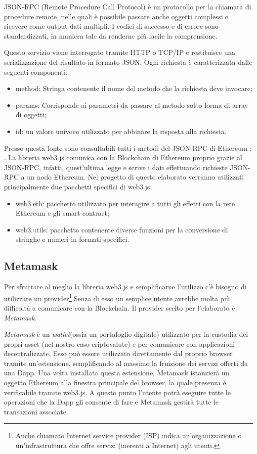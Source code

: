JSON-RPC (Remote Procedure Call Protocol) è un protocollo per la chiamata di procedure remote,  nelle quali è possibile passare anche oggetti complessi e ricevere come output dati multipli. I codici di successo e di errore sono standardizzati, in maniera tale da renderne più facile la comprensione.

Questo servizio viene interrogato tramite HTTP o TCP/IP e restituisce una serializzazione del risultato in formato JSON. Ogni richiesta è caratterizzata dalle seguenti componenti:
\begin{itemize}
\item method: Stringa contenente il nome del metodo che la richiesta deve invocare;
\item params: Corrisponde ai parametri da passare al metodo sotto forma di array di oggetti;
\item id: un valore univoco utilizzato per abbinare la risposta alla richiesta.
\end{itemize}

Presso questa fonte sono consultabili tutti i metodi del JSON-RPC di Ethereum : \cite{eth_rpc}.
La libreria web3.js comunica con la Blockchain di Ethereum proprio grazie al JSON-RPC, infatti, quest'ultima legge e scrive i dati effettuando richieste JSON-RPC a un nodo Ethereum.
Nel progetto di questo elaborato verranno utilizzati principalmente due pacchetti specifici di web3.js:
\begin{itemize}
\item web3.eth: pacchetto utilizzato per interagire a tutti gli effetti con la rete Ethereum e gli smart-contract;
\item web3.utils: pacchetto contenente diverse funzioni per la conversione di stringhe e numeri in formati specifici.
\end{itemize}

\subsection{Metamask}\label{metamask}
Per sfruttare al meglio la libreria web3.js e semplificarne l'utilizzo c'è bisogno di utilizzare un provider\footnote{Anche chiamato Internet service provider (ISP) indica un'organizzazione o un'infrastruttura che offre servizi (inerenti a Internet) agli utenti.}.Senza di esso un semplice utente avrebbe molta più difficoltà a comunicare con la Blockchain.
Il provider scelto per l'elaborato è \textit{Metamask}. 

\textit{Metamask} è un \textit{wallet}(ossia un portafoglio digitale) utilizzato per la custodia dei propri asset (nel nostro caso criptovalute) e per comunicare con applicazioni decentralizzate. Esso può essere utilizzato direttamente dal proprio browser tramite un'estensione, semplificando al massimo la fruizione dei servizi offerti da una Dapp. Una volta installata questa estensione, Metamask istanzierà un oggetto Ethereum alla finestra principale del browser, la quale presenza è verificabile tramite web3.js. 
A questo punto l'utente potrà eseguire tutte le operazioni che la Dapp gli consente di fare e Metamask gestirà tutte le transazioni associate.

